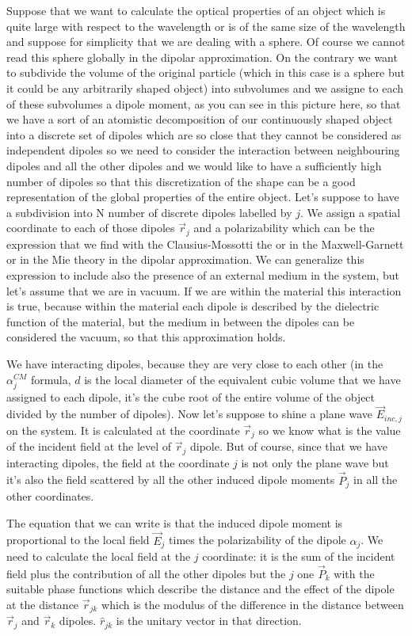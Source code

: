 \documentclass[../main/main.tex]{subfiles}
\begin{document}
Suppose that we want to calculate the optical properties of an object which is quite large with respect to the wavelength or is of the same size of the wavelength and suppose for simplicity that we are dealing with a sphere.
Of course we cannot read this sphere globally in the dipolar approximation.
On the contrary we want to subdivide the volume of the original particle (which in this case is a sphere but it could be any arbitrarily shaped object) into subvolumes and we assigne to each of these subvolumes a dipole moment, as you can see in this picture here, so that we have a sort of an atomistic decomposition of our continuously shaped object into a discrete set of dipoles which are so close that they cannot be considered as independent dipoles so we need to consider the interaction between neighbouring dipoles and all the other dipoles and we would like to have a sufficiently high number of dipoles so that this discretization of the shape can be a good representation of the global properties of the entire object.
Let's suppose to have a subdivision into N number of discrete dipoles labelled by $j$.
We assign a spatial coordinate to each of those dipoles $\vec{r}_j$ and a polarizability which can be the  expression that we find with the Clausius-Mossotti the or in the Maxwell-Garnett or in the Mie theory in the dipolar approximation.
We can generalize this expression to include also the presence of an external medium in the system, but let's assume that we are in vacuum.
If we are within the material this interaction is true, because within the material each dipole is described by the dielectric function of the material, but the medium in between the dipoles can be considered the vacuum, so that this approximation holds.

We have interacting dipoles, because they are very close to each other (in the $\alpha_j^{CM}$ formula, $d$  is the local diameter of the equivalent cubic volume that we have assigned to each dipole, it’s the cube root of the entire volume of the object divided by the number of dipoles).
Now let's suppose to shine a plane wave $\vec{E}_{inc,j}$ on the system.
It is calculated at the coordinate $\vec{r}_j$ so we know what is the value of the incident field at the level of $\vec{r}_j$ dipole.
But of course, since that we have interacting dipoles, the field at the coordinate $j$ is not only the plane wave but it's also the field scattered by all the other induced dipole moments $\vec{P}_j$ in all the other coordinates.

The equation that we can write is that the induced dipole moment is proportional to the local field $\vec{E}_j$ times the polarizability of the dipole $\alpha_j$. 
We need to calculate the local field at the $j$ coordinate: it is the sum of the incident field plus the contribution of all the other dipoles but the $j$ one $\vec{P}_k$ with the suitable phase functions which describe the distance and the effect of the dipole at the distance $\vec{r}_{jk}$  which is the modulus of the difference in the distance between $\vec{r}_{j}$ and $\vec{r}_{k}$ dipoles.  $\hat{r}_{jk}$  is the unitary vector in that direction.
\end{document}
